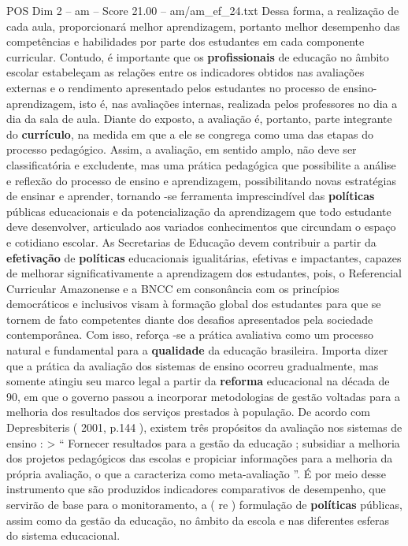 \begin{textsample}{POS Dim 2 – am – Score 21.00 – am/am\_ef\_24.txt}
Dessa forma, a realização de cada aula, proporcionará melhor aprendizagem, portanto melhor desempenho das competências e habilidades por parte dos estudantes em cada componente curricular.
Contudo, é importante que os \textbf{profissionais} de educação no âmbito escolar estabeleçam as relações entre os indicadores obtidos nas avaliações externas e o rendimento apresentado pelos estudantes no processo de ensino-aprendizagem, isto é, nas avaliações internas, realizada pelos professores no dia a dia da sala de aula.
Diante do exposto, a avaliação é, portanto, parte integrante do \textbf{currículo}, na medida em que a ele se congrega como uma das etapas do processo pedagógico.
Assim, a avaliação, em sentido amplo, não deve ser classificatória e excludente, mas uma prática pedagógica que possibilite a análise e reflexão do processo de ensino e aprendizagem, possibilitando novas estratégias de ensinar e aprender, tornando -se ferramenta imprescindível das \textbf{políticas} públicas educacionais e da potencialização da aprendizagem que todo estudante deve desenvolver, articulado aos variados conhecimentos que circundam o espaço e cotidiano escolar.
As Secretarias de Educação devem contribuir a partir da \textbf{efetivação} de \textbf{políticas} educacionais igualitárias, efetivas e impactantes, capazes de melhorar significativamente a aprendizagem dos estudantes, pois, o Referencial Curricular Amazonense e a BNCC em consonância com os princípios democráticos e inclusivos visam à formação global dos estudantes para que se tornem de fato competentes diante dos desafios apresentados pela sociedade contemporânea.
Com isso, reforça -se a prática avaliativa como um processo natural e fundamental para a \textbf{qualidade} da educação brasileira.
Importa dizer que a prática da avaliação dos sistemas de ensino ocorreu gradualmente, mas somente atingiu seu marco legal a partir da \textbf{reforma} educacional na década de 90, em que o governo passou a incorporar metodologias de gestão voltadas para a melhoria dos resultados dos serviços prestados à população.
De acordo com Depresbiteris ( 2001, p.144 ), existem três propósitos da avaliação nos sistemas de ensino : > “ Fornecer resultados para a gestão da educação ; subsidiar a melhoria dos projetos pedagógicos das escolas e propiciar informações para a melhoria da própria avaliação, o que a caracteriza como meta-avaliação ”.
É por meio desse instrumento que são produzidos indicadores comparativos de desempenho, que servirão de base para o monitoramento, a ( re ) formulação de \textbf{políticas} públicas, assim como da gestão da educação, no âmbito da escola e nas diferentes esferas do sistema educacional.

\end{textsample}
